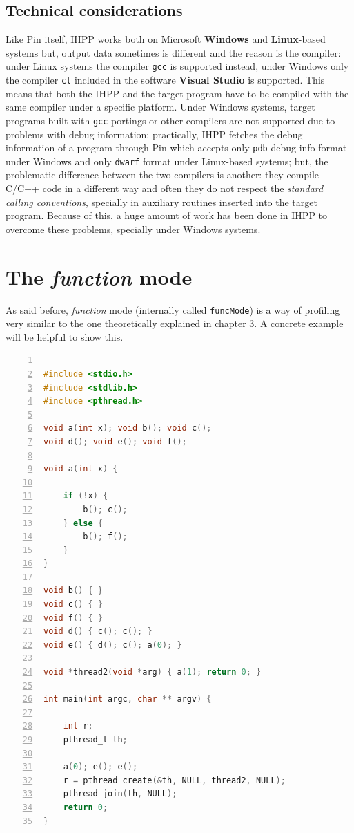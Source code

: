 \documentclass[a4paper,10pt]{report}
\begin{document}
\subsection{Technical considerations}

Like Pin itself, IHPP works both on Microsoft \textbf{Windows} and \textbf{Linux}-based systems but, output data sometimes is different and the reason is the compiler: 
under Linux systems the compiler \verb|gcc| is supported instead, under Windows only the compiler \verb|cl| included in the software \textbf{Visual Studio} is supported. 
This means that both the IHPP and the target program have to be compiled with the same compiler under a specific platform. Under Windows systems, target programs built with \verb|gcc| portings or other compilers are not supported due to problems with debug information: 
practically, IHPP fetches the debug information of a program through Pin which accepts only \verb|pdb| debug info format under Windows and only \verb|dwarf| format under Linux-based systems; but, the problematic difference between the two compilers is another: 
they compile C/C++ code in a different way and often they do not respect the \emph{standard calling conventions}, specially in auxiliary routines inserted into the target program. 
Because of this, a huge amount of work has been done in IHPP to overcome these problems, 
specially under Windows systems.

\section{The \emph{function} mode}

As said before, \emph{function} mode (internally called \verb|funcMode|) 
is a way of profiling very similar to the one theoretically explained in chapter 3.
A concrete example will be helpful to show this.

\begin{lstlisting}[language=C, 
	caption={prog1.c, a simple multi-threaded program}, 
	label=prog1, frame=leftline, numbers=left]

#include <stdio.h>
#include <stdlib.h>
#include <pthread.h>

void a(int x); void b(); void c();
void d(); void e(); void f();

void a(int x) { 

	if (!x) { 
		b(); c(); 
	} else { 
		b(); f();
	} 
}

void b() { }
void c() { }
void f() { }
void d() { c(); c(); }
void e() { d(); c(); a(0); }

void *thread2(void *arg) { a(1); return 0; }

int main(int argc, char ** argv) {

	int r;
	pthread_t th;

	a(0); e(); e();
	r = pthread_create(&th, NULL, thread2, NULL);
	pthread_join(th, NULL);
	return 0;
}

\end{lstlisting}
\end{document}
